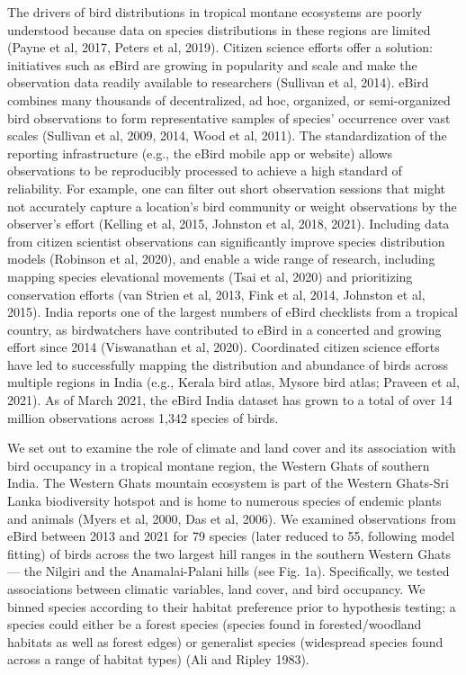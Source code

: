 The drivers of bird distributions in tropical montane ecosystems are poorly understood because data on species distributions in these regions are limited (Payne et al, 2017, Peters et al, 2019).
Citizen science efforts offer a solution: initiatives such as eBird are growing in popularity and scale and make the observation data readily available to researchers (Sullivan et al, 2014).
eBird combines many thousands of decentralized, ad hoc, organized, or semi-organized bird observations to form representative samples of species' occurrence over vast scales (Sullivan et al, 2009, 2014, Wood et al, 2011).
The standardization of the reporting infrastructure (e.g., the eBird mobile app or website) allows observations to be reproducibly processed to achieve a high standard of reliability.
For example, one can filter out short observation sessions that might not accurately capture a location's bird community or weight observations by the observer's effort (Kelling et al, 2015, Johnston et al, 2018, 2021).
Including data from citizen scientist observations can significantly improve species distribution models (Robinson et al, 2020), and enable a wide range of research, including mapping species elevational movements (Tsai et al, 2020) and prioritizing conservation efforts (van Strien et al, 2013, Fink et al, 2014, Johnston et al, 2015).
India reports one of the largest numbers of eBird checklists from a tropical country, as birdwatchers have contributed to eBird in a concerted and growing effort since 2014 (Viswanathan et al, 2020).
Coordinated citizen science efforts have led to successfully mapping the distribution and abundance of birds across multiple regions in India (e.g., Kerala bird atlas, Mysore bird atlas; Praveen et al, 2021).
As of March 2021, the eBird India dataset has grown to a total of over 14 million observations across 1,342 species of birds.

We set out to examine the role of climate and land cover and its association with bird occupancy in a tropical montane region, the Western Ghats of southern India.
The Western Ghats mountain ecosystem is part of the Western Ghats-Sri Lanka biodiversity hotspot and is home to numerous species of endemic plants and animals (Myers et al, 2000, Das et al, 2006).
We examined observations from eBird between 2013 and 2021 for 79 species (later reduced to 55, following model fitting) of birds across the two largest hill ranges in the southern Western Ghats --- the Nilgiri and the Anamalai-Palani hills (see Fig. 1a).
Specifically, we tested associations between climatic variables, land cover, and bird occupancy.
We binned species according to their habitat preference prior to hypothesis testing; a species could either be a forest species (species found in forested/woodland habitats as well as forest edges) or generalist species (widespread species found across a range of habitat types) (Ali and Ripley 1983).

